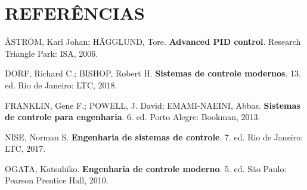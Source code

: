 \clearpage
{}
\section*{REFERÊNCIAS}

\begin{flushleft}
\singlespacing
\setlength{\parindent}{0pt}

\AA{}STR\"OM, Karl Johan; H\"AGGLUND, Tore. \textbf{Advanced PID control}. Research Triangle Park: ISA, 2006.

\vspace{\baselineskip}
DORF, Richard C.; BISHOP, Robert H. \textbf{Sistemas de controle modernos}. 13. ed. Rio de Janeiro: LTC, 2018.

\vspace{\baselineskip}
FRANKLIN, Gene F.; POWELL, J. David; EMAMI-NAEINI, Abbas. \textbf{Sistemas de controle para engenharia}. 6. ed. Porto Alegre: Bookman, 2013.

\vspace{\baselineskip}
NISE, Norman S. \textbf{Engenharia de sistemas de controle}. 7. ed. Rio de Janeiro: LTC, 2017.

\vspace{\baselineskip}
OGATA, Katsuhiko. \textbf{Engenharia de controle moderno}. 5. ed. São Paulo: Pearson Prentice Hall, 2010.

\end{flushleft}
